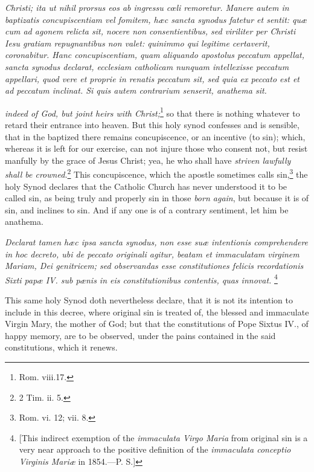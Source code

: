 \emph{Christi; ita ut nihil prorsus eos ab ingressu cœli remoretur. Manere autem in baptizatis concupiscentiam vel fomitem, hæc sancta synodus fatetur et sentit: quæ cum ad agonem relicta sit, nocere non consentientibus, sed viriliter per Christi Iesu gratiam repugnantibus non valet: quinimmo qui legitime certaverit, coronabitur. Hanc concupiscentiam, quam aliquando apostolus peccatum appellat, sancta synodus declarat, ecclesiam catholicam nunquam intellexisse peccatum appellari, quod vere et proprie in renatis peccatum sit, sed quia ex peccato est et ad peccatum inclinat. Si quis autem contrarium senserit, anathema sit.}

\emph{indeed of God, but joint heirs with Christ;}\footnote{\par   Rom. viii.17.} so that there is nothing whatever to retard their entrance into heaven. But this holy synod confesses and is sensible, that in the baptized there remains concupiscence, or an incentive (to sin); which, whereas it is left for our exercise, can not injure those who consent not, but resist manfully by the grace of Jesus Christ; yea, he who shall have \emph{striven lawfully shall be crowned.}\footnote{\par   2 Tim. ii. 5.} This concupiscence, which the apostle sometimes calls sin,\footnote{\par   Rom. vi. 12;  vii. 8.} the holy Synod declares that the Catholic Church has never understood it to be called sin, as being truly and properly sin in those \emph{born again}, but because it is of sin, and inclines to sin. And if any one is of a contrary sentiment, let him be anathema.

\emph{Declarat tamen hæc ipsa sancta synodus, non esse suæ intentionis comprehendere in hoc decreto, ubi de peccato originali agitur, beatam et immaculatam virginem Mariam, Dei genitricem; sed observandas esse constitutiones felicis recordationis Sixti papæ IV. sub pænis in eis constitutionibus contentis, quas innovat.} \footnote{\par{} [This indirect exemption of the \emph{ immaculata Virgo Maria }from original sin is a very near approach to the positive definition of the \emph{ immaculata conceptio Virginis Mariæ }in 1854.—P. S.]}

This same holy Synod doth nevertheless declare, that it is not its intention to include in this decree, where original sin is treated of, the blessed and immaculate Virgin Mary, the mother of God; but that the constitutions of Pope Sixtus IV., of happy memory, are to be observed, under the pains contained in the said constitutions, which it renews.

